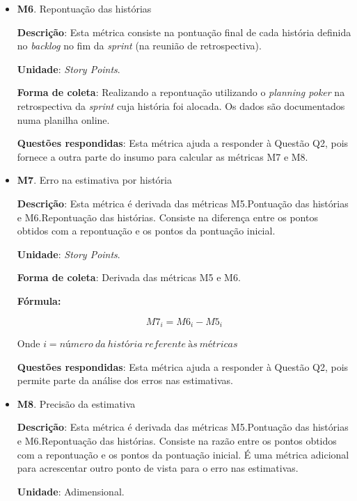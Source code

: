 \begin{itemize}
	 \item \textbf{M6}. Repontuação das histórias
	   
	   \subitem \textbf{Descrição}: Esta métrica consiste na pontuação final de cada história definida no \textit{backlog} no fim
		    da \textit{sprint} (na reunião de retrospectiva).
	   
	   \subitem \textbf{Unidade}: \textit{Story Points}.
	   
	   \subitem \textbf{Forma de coleta}: Realizando a repontuação utilizando o \textit{planning poker} na retrospectiva da \textit{sprint}
		    cuja história foi alocada. Os dados são documentados numa planilha online.
	   
	   \subitem \textbf{Questões respondidas}: Esta métrica ajuda a responder à Questão Q2, pois fornece a outra parte do insumo para calcular 
		    as métricas M7 e M8.
		    
	 \item \textbf{M7}. Erro na estimativa por história
	 
	   \subitem \textbf{Descrição}: Esta métrica é derivada das métricas M5.Pontuação das histórias e M6.Repontuação das histórias.
		    Consiste na diferença entre os pontos obtidos com a repontuação e os pontos da pontuação inicial.
	   
	   \subitem \textbf{Unidade}: \textit{Story Points}.
	   
	   \subitem \textbf{Forma de coleta}: Derivada das métricas M5 e M6.
	   
	      \subsubitem \textbf{Fórmula:} 
	      
		$$ M7_i = M6_i - M5_i $$
		
	      \subsubitem Onde $i = número\ da\ história\ referente\ às\ métricas$
	   
	   \subitem \textbf{Questões respondidas}: Esta métrica ajuda a responder à Questão Q2, pois permite parte da análise 
		    dos erros nas estimativas.
	 
	 \item \textbf{M8}. Precisão da estimativa
	 
	   \subitem \textbf{Descrição}: Esta métrica é derivada das métricas M5.Pontuação das histórias e M6.Repontuação das histórias.
		    Consiste na razão entre os pontos obtidos com a repontuação e os pontos da pontuação inicial. É uma métrica adicional
		    para acrescentar outro ponto de vista para o erro nas estimativas.
	   
	   \subitem \textbf{Unidade}: Adimensional.
	   

\end{itemize}
